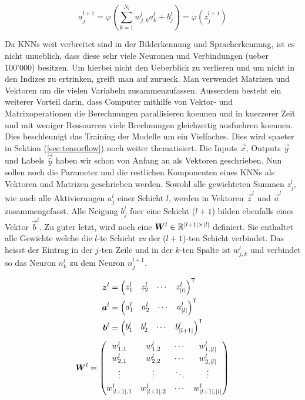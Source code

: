 \documentclass[../main]{subfiles}
\begin{document}
\begin{equation}\label{eq:aktivierung_normal}
  a_j^{l+1} = \varphi\left(\sum_{k=1}^{N_l} w_{j,k}^l a_k^{l} + b_j^l \right) = \varphi \left( z_j^{l+1} \right)
\end{equation}
\par\bigskip
Da KNNs weit verbreitet sind in der Bilderkennung und Spracherkennung, ist es
nicht unueblich, dass diese sehr viele Neuronen und Verbindungen (ueber 100'000) besitzen.
Um hierbei nicht den Ueberblick zu verlieren und um nicht in den Indizes zu
ertrinken, greift man auf  zurueck. Man verwendet
Matrizen und Vektoren um die vielen Variabeln zusammenzufassen.
Ausserdem besteht ein weiterer Vorteil darin, dass Computer mithilfe von Vektor-
und Matrixoperationen die Berechnungen parallisieren koennen und in kuerzerer
Zeit und mit weniger Ressourcen viele Brechnungen gleichzeitig ausfuehren koennen.
Dies beschleunigt das Training der Modelle um
ein Vielfaches. Dies wird spaeter in Sektion
(\ref{sec:tensorflow}) noch weiter thematisiert.
\para{}
Die Inputs $\vec{x}$, Outputs $\vec{y}$ und Labels $\vec{\hat{y}}$ haben wir schon von Anfang an als Vektoren geschrieben.
Nun sollen noch die Parameter und die restlichen Komponenten eines KNNs als Vektoren und Matrizen geschrieben werden.
Sowohl alle gewichteten Summen $z_j^l$, wie auch alle Aktivierungen $a_j^l$
einer Schicht $l$, werden in Vektoren $\vec{z}^l$ und $\vec{a}^l$ zusammengefasst.
Alle Neigung $b_j^l$ fuer eine Schicht ($l+1$) bilden ebenfalls eines Vektor $\vec{b}^l$.
Zu guter letzt, wird noch eine  $\bm{W}^l \in
\mathbb{R}^{|l+1| \times |l|}$
definiert. Sie enthaltet alle Gewichte welche die $l$-te
Schicht \textit{zu} der ($l+1$)-ten Schicht verbindet.
Das heisst der Eintrag in der $j$-ten Zeile und in
der $k$-ten Spalte ist $w_{j,k}^l$ und verbindet so das Neuron $n_k^{l}$ zu
dem Neuron $n_j^{l+1}$.
\para{}

\begin{align*}
  \bm{z}^l &=  \begin{pmatrix} z_1^l & z_2^l & \cdots & z_{|l|}^l \end{pmatrix}^{\mathsf{T}} \\
  \bm{a}^l &=  \begin{pmatrix} a_1^l & a_2^l & \cdots & a_{|l|}^l \end{pmatrix}^{\mathsf{T}} \\
  \bm{b}^l &=  \begin{pmatrix} b_1^l & b_2^l & \cdots & b_{|l+1|}^l \end{pmatrix}^{\mathsf{T}} \\
\end{align*}
\begin{equation*}
  \bm{W}^l =
  \begin{pmatrix}
    w_{1,1}^l & w_{1,2}^l & \cdots & w_{1,|l|}^l \\[0.3em]
    w_{2,1}^l & w_{2,2}^l & \cdots & w_{2,|l|}^l \\[0.3em]
    \vdots & \vdots & \ddots & \vdots \\[0.3em]
    w_{|l+1|,1}^l & w_{|l+1|,2}^l & \cdots & w_{|l+1|,|l|}^l
  \end{pmatrix}
\end{equation*}
\end{document}
